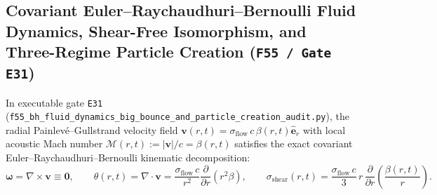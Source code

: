 \documentclass[11pt,a4paper]{article}
\theoremstyle{remark}
\begin{document}
\subsection{Covariant Euler--Raychaudhuri--Bernoulli Fluid Dynamics, Shear-Free Isomorphism, and Three-Regime Particle Creation (\texttt{F55 / Gate E31})}
\label{sec:f55_fluid_dynamics}

In executable gate \texttt{E31} (\texttt{f55\_\allowbreak bh\_\allowbreak fluid\_\allowbreak dynamics\_\allowbreak big\_\allowbreak bounce\_\allowbreak and\_\allowbreak particle\_\allowbreak creation\_\allowbreak audit.py}), the radial Painlev\'e--Gullstrand velocity field $\mathbf{v}(r,t) = \sigma_{\mathrm{flow}}\,c\,\beta(r,t)\hat{\mathbf{e}}_r$ with local acoustic Mach number $\mathcal{M}(r,t) := |\mathbf{v}|/c = \beta(r,t)$ satisfies the exact covariant Euler--Raychaudhuri--Bernoulli kinematic decomposition:
\begin{equation}
  \boldsymbol{\omega} = \nabla\times\mathbf{v} \equiv \mathbf{0}, \qquad
  \theta(r,t) = \nabla\cdot\mathbf{v} = \frac{\sigma_{\mathrm{flow}}\,c}{r^2}\frac{\partial}{\partial r}\!\left(r^2\beta\right), \qquad
  \sigma_{\mathrm{shear}}(r,t) = \frac{\sigma_{\mathrm{flow}}\,c}{3}\,r\,\frac{\partial}{\partial r}\!\left(\frac{\beta(r,t)}{r}\right).
  \label{eq:f55_kinematics}
\end{equation}
\end{document}
